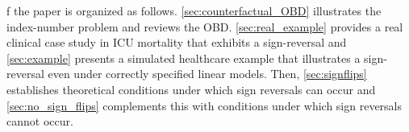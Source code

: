 f the paper is organized as follows. 
\cref{sec:counterfactual_OBD} illustrates the index-number problem and reviews the OBD. 
\cref{sec:real_example} provides a real clinical case study in ICU mortality that exhibits a sign-reversal and 
\cref{sec:example} presents a simulated healthcare example that illustrates a sign-reversal even under correctly specified linear models. Then, \cref{sec:signflips} establishes theoretical conditions under which sign reversals can occur and \cref{sec:no_sign_flips} complements this with conditions under which sign reversals cannot occur. 

